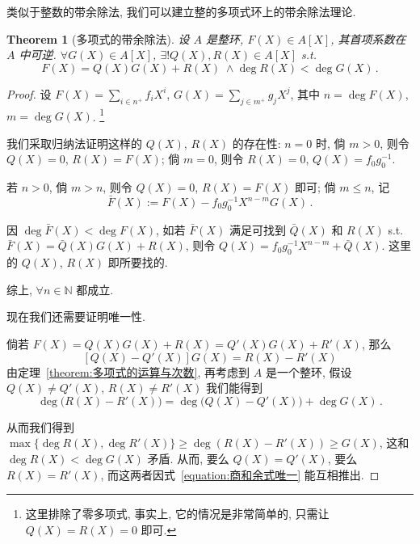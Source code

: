 \documentclass[openany]{ctexbook}
\theoremstyle{plain}
\newtheorem{theorem}{Theorem}[section] %
\theoremstyle{definition}
\begin{document}
类似于整数的带余除法, 我们可以建立整的多项式环上的带余除法理论.

\begin{theorem}[多项式的带余除法]\label{theorem:多项式的带余除法}
	设 $A$ 是整环, $F(X) \in A[X]$, 其首项系数在 $A$ 中可逆. 
	$\forall G(X) \in A[X]$, $\exists! Q(X), R(X) \in A[X]$ s.t.\ 
	\begin{equation*}
		F(X) = Q(X) G(X) + R(X)\; \wedge \deg R(X) < \deg G(X)\,.
	\end{equation*}
\end{theorem}
\begin{proof}
	设 $F(X) = \sum_{i \in n^+} f_i X^i$, $G(X) = \sum_{j \in m^+} g_j X^j$, 其中 $n = \deg F(X)$, $m = \deg G(X)$. \footnote{这里排除了零多项式, 事实上, 它的情况是非常简单的, 只需让 $Q(X) = R(X) = 0$ 即可.} 

	我们采取归纳法证明这样的 $Q(X)$, $R(X)$ 的存在性:
	$n = 0$ 时, 倘 $m > 0$, 则令 $Q(X) = 0$, $R(X) = F(X)$; 
	倘 $m = 0$, 则令 $R(X) = 0$, $Q(X) = f_0 g_0^{-1}$.

	若 $n > 0$, 倘 $m > n$, 则令 $Q(X) = 0$, $R(X) = F(X)$ 即可;
	倘 $m \leq n$, 记
	\begin{equation*}
		\bar F(X) := F(X) - f_0 g_0^{-1} X^{n - m} G(X)\,.
	\end{equation*}

	因 $\deg \bar F(X) < \deg F(X)$, 如若 $\bar F(X)$ 满足可找到 $\bar Q(X)$ 和 $R(X)$ s.t.\ $\bar F(X) = \bar Q(X) G(X) + R(X)$, 则令 $Q(X) = f_0 g_0^{-1} X^{n - m} + \bar Q(X)$. 
	这里的 $Q(X)$, $R(X)$ 即所要找的.

	综上, $\forall n \in \mathbb N$ 都成立.

	现在我们还需要证明唯一性.

	倘若 $F(X) = Q(X) G(X) + R(X) = Q'(X) G(X) + R'(X)$, 那么
	\begin{equation}\label{equation:商和余式唯一}
		[Q(X) - Q'(X)] G(X) = R(X) - R'(X)
	\end{equation}
	由定理~\ref{theorem:多项式的运算与次数}, 再考虑到 $A$ 是一个整环, 假设 $Q(X) \neq Q'(X)$, $R(X) \neq R'(X)$ 我们能得到
	\begin{equation*}
		\deg \big(R(X) - R'(X)\big) = \deg \big( Q(X) - Q'(X)\big) + \deg G(X)\,.
	\end{equation*}

	从而我们得到 $\max\{\deg R(X), \deg R'(X) \} \geq \deg(R(X) - R'(X)) \geq G(X)$, 这和 $\deg R(X) < \deg G(X)$ 矛盾. 从而, 要么 $Q(X) = Q'(X)$, 要么 $R(X) = R'(X)$, 而这两者因式~\ref{equation:商和余式唯一} 能互相推出.
\end{proof}
\end{document}
